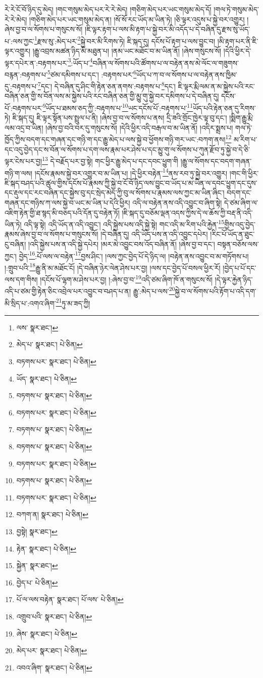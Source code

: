 རེ་རེ་ངོ་བོ་ཉིད་དུ་མེད། །གང་གསུམ་མེད་པར་རེ་རེ་མེད། །གཅིག་མེད་པར་ཡང་གསུམ་མེད་དོ། །གལ་ཏེ་གསུམ་མེད་རེ་རེ་མེད། །གཅིག་མེད་པར་ཡང་གསུམ་མེད་ན། །སོ་སོ་རང་ཡོད་མ་ཡིན་ཏེ། །ཅི་ལྟར་འདུས་པ་སྐྱེ་བར་འགྱུར། །ཞེས་བྱ་བ་ལ་སོགས་པ་གསུངས་སོ། །ཇི་ལྟར་རྟག་པ་ལས་མི་རྟག་པ་སྐྱེ་བར་མི་འདོད་པ་དེ་བཞིན་དུ་རྫས་སུ་ཡོད་པ་:ལས་ཀྱང་\footnote{ལས་  སྣར་ཐང་། }རྫས་སུ་:མེད་པར་\footnote{མེད་པ་  སྣར་ཐང་།  པེ་ཅིན། }སྐྱེ་བར་མི་རིགས་ཏེ། ཇི་སྐད་དུ། དངོས་པོ་རྟག་པ་ལས་བྱུང་བ། །མི་རྟག་པར་ནི་ཇི་ལྟར་འགྱུར། །རྒྱུ་འབྲས་མཚན་ཉིད་མི་མཐུན་པ། །ནམ་ཡང་མཐོང་བ་མ་ཡིན་ནོ། །ཞེས་གསུངས་སོ། །དེའི་ཕྱིར་དེ་ལྟར་དཔེར་ན་:བརྟགས་པར་\footnote{བཏགས་པར་  སྣར་ཐང་།  པེ་ཅིན། }:ཡོད་པ་\footnote{ཡོད་  སྣར་ཐང་།  པེ་ཅིན། }བཞིན་ལ་སོགས་པའི་ཚོགས་པ་ལ་བརྟེན་ནས་མེ་ལོང་ལ་གཟུགས་བརྙན་:བརྟགས་པ་\footnote{བཏགས་པ་  སྣར་ཐང་།  པེ་ཅིན། }ཙམ་དམིགས་པ་དང་། :བརྟགས་པར་\footnote{བཏགས་པར་  སྣར་ཐང་།  པེ་ཅིན། }ཡོད་པ་ཀ་བ་ལ་སོགས་པ་ལ་བརྟེན་ནས་ཁྱིམ་དུ་:བརྟགས་པ་\footnote{བཏགས་པ་  སྣར་ཐང་།  པེ་ཅིན། }དང་། དེ་བཞིན་དུ་ཤིང་གི་རྟེན་ཅན་ནགས་:བརྟགས་པ་\footnote{བཏགས་པ་  སྣར་ཐང་།  པེ་ཅིན། }དང་། ཇི་ལྟར་རྨི་ལམ་ན་མ་སྐྱེས་པའི་རང་བཞིན་ཅན་གྱི་ས་བོན་ལས་མ་སྐྱེས་པའི་རང་བཞིན་ཅན་གྱི་མྱུ་གུ་སྐྱེ་བར་དམིགས་པ་དེ་བཞིན་དུ། དངོས་པོ་:བརྟགས་པར་\footnote{བཏགས་པར་  སྣར་ཐང་།  པེ་ཅིན། }ཡོད་པ་ཐམས་ཅད་ཀྱི་:བརྟགས་པ་\footnote{བཏགས་པ་  སྣར་ཐང་།  པེ་ཅིན། }ཡང་དངོས་པོ་:བརྟགས་པ་\footnote{བཏགས་པར་  སྣར་ཐང་།  པེ་ཅིན། }ཡོད་པའི་རྟེན་ཅན་དུ་རིགས་ཏེ། ཇི་སྐད་དུ། ཇི་ལྟར་སྟོན་པས་སྤྲུལ་པ་ནི། །ཞེས་བྱ་བ་ལ་སོགས་པ་ནས། དྲི་ཟའི་གྲོང་ཁྱེར་ལྟ་བུ་དང་། །སྨིག་རྒྱུ་རྨི་ལམ་འདྲ་བ་ཡིན། །ཞེས་བྱ་བའི་བར་དུ་གསུངས་སོ། །དེའི་ཕྱིར་འདི་བརྒལ་བ་མ་ཡིན་ནོ། །འདིར་སྨྲས་པ། གལ་ཏེ་ཁྱོད་ཀྱིས་བདག་དང་གཞན་དང་གཉི་ག་དང་རྒྱུ་མེད་པ་ལས་སྐྱེ་བ་ཕྱོགས་གཉི་གར་ཡང་:བཀག་ནས།\footnote{བཀག་ན།  སྣར་ཐང་།  པེ་ཅིན། } མ་རིག་པ་དང་འདུ་བྱེད་དང་ས་བོན་ལ་སོགས་པ་དག་ལས་རྣམ་པར་ཤེས་པ་དང་མྱུ་གུ་ལ་སོགས་པ་ཀུན་རྫོབ་ཏུ་སྐྱེ་བ་དེ་ཅི་ལྟར་ངེས་པར་བྱ།\footnote{བྱསྟེ།  སྣར་ཐང་། } དེ་བརྗོད་པར་བྱ་སྟེ། གང་ཕྱིར་རྒྱུ་མེད་པ་དང་དབང་ཕྱུག་གི །རྒྱུ་ལ་སོགས་དང་བདག་གཞན་གཉི་ག་ལས། །དངོས་རྣམས་སྐྱེ་བར་འགྱུར་བ་མ་ཡིན་པ། །དེ་ཕྱིར་བརྟེན་\footnote{རྟེན་  སྣར་ཐང་།  པེ་ཅིན། }ནས་རབ་ཏུ་སྐྱེ་བར་འགྱུར། །གང་གི་ཕྱིར་ཇི་སྐད་བཤད་པའི་ཚུལ་གྱིས་དངོས་པོ་རྣམས་ཀྱི་སྐྱེ་བ་ངོ་བོ་ཉིད་ལས་བྱུང་བ་ཡོད་པ་མ་ཡིན་ལ་དབང་ཕྱུག་དང་དུས་དང་རྡུལ་དང་རང་བཞིན་དང་སྐྱེས་བུ་དང་སྲེད་མེད་ཀྱི་བུ་ལ་སོགས་པ་རྣམས་ལས་ཀྱང་མ་ཡིན་ཞིང་། བདག་དང་གཞན་དང་གཉིས་ཀ་ལས་སྐྱེ་བ་ཡང་མ་ཡིན་པ་དེའི་ཕྱིར། འདི་ལ་བརྟེན་ནས་འདི་འབྱུང་བ་ཞིག་སྟེ། དེ་ཙམ་ཞིག་ལ་འཇིག་རྟེན་གྱི་ཐ་སྙད་མི་བཅད་པའི་དོན་དུ་བརྟེན་ཏོ། །ཇི་སྐད་དུ་བཅོམ་ལྡན་འདས་ཀྱིས་དེ་ལ་ཆོས་ཀྱི་བརྡ་ནི་འདི་ཡིན་ཏེ། འདི་ལྟ་སྟེ། འདི་ཡོད་ན་འདི་འབྱུང་། འདི་སྐྱེས་པས་འདི་སྐྱེ་སྟེ། གང་འདི་མ་རིག་པའི་རྐྱེན་\footnote{སྐྱེན་  སྣར་ཐང་། }གྱིས་འདུ་བྱེད་རྣམས་ཞེས་བྱ་བ་ལ་སོགས་པ་གསུངས་སོ། །དེ་བཞིན་དུ། འདི་ཡོད་པས་ན་འདི་འབྱུང་དཔེར། །རིང་པོ་ཡོད་ན་ཐུང་ངུ་བཞིན། །འདི་སྐྱེས་པས་ན་འདི་སྐྱེ་དཔེར། །མར་མེ་འབྱུང་བས་འོད་བཞིན་ནོ། །ཞེས་བྱ་བ་དང་། བསྟན་བཅོས་ལས་ཀྱང་། བྱེད་\footnote{བྱེད་པ་  པེ་ཅིན། }:པོ་ལས་ལ་བརྟེན་\footnote{པོ་ལ་ལས་བརྟེན་  སྣར་ཐང་། པོ་ལས་  པེ་ཅིན། }བྱས་ཤིང་། །ལས་ཀྱང་བྱེད་པོ་དེ་ཉིད་ལ། །བརྟེན་ནས་འབྱུང་བ་མ་གཏོགས་པ། །:གྲུབ་པའི་\footnote{འགྲུབ་པའི་  སྣར་ཐང་།  པེ་ཅིན། }རྒྱུ་ནི་མ་མཐོང་ངོ། །དེ་བཞིན་ཉེར་ལེན་ཤེས་པར་བྱ། །ལས་དང་བྱེད་པོ་བསལ་ཕྱིར་རོ། །བྱེད་པ་པོ་དང་ལས་དག་གིས། །དངོས་པོ་ལྷག་མ་ཤེས་པར་བྱ། །:ཞེས་བྱ་བ་\footnote{ཞེས་  སྣར་ཐང་།  པེ་ཅིན། }འདི་ཙམ་ཞིག་ཁོ་ན་གསུངས་སོ། །དེ་ལྟར་རྐྱེན་ཉིད་འདི་པ་ཙམ་གྱི་རྟེན་ཅིང་འབྲེལ་པར་འབྱུང་བ་བཤད་པ་ན། རྒྱུ་:མེད་པ་ལས་\footnote{མེད་པར་  སྣར་ཐང་།  པེ་ཅིན། }སྐྱེ་བ་ལ་སོགས་པའི་རྟོག་པ་འདི་དག་མི་སྲིད་པ་:འགའ་ཞིག་\footnote{འབའ་ཞིག་  སྣར་ཐང་།  པེ་ཅིན། }ཏུ་མ་ཟད་ཀྱི། 